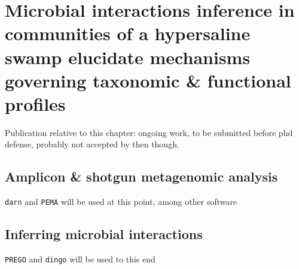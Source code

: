 % 
% 

\chapter{Microbial interactions inference in communities of a hypersaline 
         swamp elucidate mechanisms governing taxonomic \& functional profiles}
\label{cha:swamp}

Publication relative to this chapter: ongoing work, to be submitted before phd defense, probably not accepted by then though.


\section{Amplicon \& shotgun metagenomic analysis}


\texttt{darn} and \texttt{PEMA} will be used at this point, among other software 

\section{Inferring microbial interactions }

\texttt{PREGO} and \texttt{dingo} will be used to this end 

















